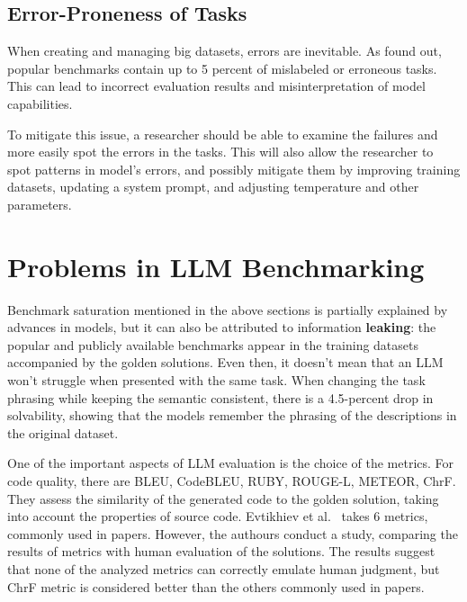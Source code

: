 \subsection{Error-Proneness of Tasks}

When creating and managing big datasets, errors are inevitable.
As\cite{vendrow2025largelanguagemodelbenchmarks} found out, popular benchmarks contain up to 5 percent of mislabeled or erroneous tasks.
This can lead to incorrect evaluation results and misinterpretation of model capabilities.

To mitigate this issue, a researcher should be able to examine the failures and more easily spot the errors in the tasks.
This will also allow the researcher to spot patterns in model's errors, and possibly mitigate them by improving training datasets, updating a system prompt, and adjusting temperature and other parameters.

\section{Problems in LLM Benchmarking}


Benchmark saturation mentioned in the above sections is partially explained by advances in models, but it can also be attributed to information \textbf{leaking}: the popular and publicly available benchmarks appear in the training datasets accompanied by the golden solutions.
Even then, it doesn't mean that an LLM won't struggle when presented with the same task.
When changing the task phrasing while keeping the semantic consistent, there is a 4.5-percent drop in solvability, showing that the models remember the phrasing of the descriptions in the original dataset. \cite{uniyal2024one}

One of the important aspects of LLM evaluation is the choice of the metrics.
For code quality, there are BLEU, CodeBLEU, RUBY, ROUGE-L, METEOR, ChrF\@.
They assess the similarity of the generated code to the golden solution, taking into account the properties of source code.
Evtikhiev et al.~\cite{evtikhiev2023out} takes 6 metrics, commonly used in papers.
However, the authours conduct a study, comparing the results of metrics with human evaluation of the solutions.
The results suggest that none of the analyzed metrics can correctly emulate human judgment, but ChrF metric is considered better than the others commonly used in papers.


